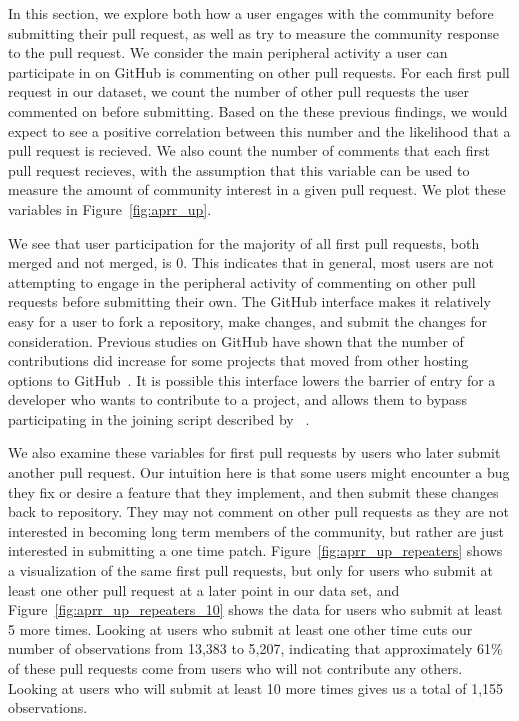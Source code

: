 \documentclass{iitthesis}
\begin{document}
 \label{chap:results}

 \label{sec:communities}

In this section, we explore both how a user engages with the community before
submitting their pull request, as well as try to measure the community response
to the pull request.  We consider the main peripheral activity a user can
participate in on GitHub is commenting on other pull requests. For each first
pull request in our dataset, we count the number of other pull requests the user
commented on before submitting. Based on the these previous findings, we would
expect to see a positive correlation between this number and the likelihood that
a pull request is recieved. We also count the number of comments that each first
pull request recieves, with the assumption that this variable can be used to
measure the amount of community interest in a given pull request. We plot these
variables in Figure~\ref{fig:aprr_up}.

We see that user participation for the majority of all first pull requests, both
merged and not merged, is 0. This indicates that in general, most users are not
attempting to engage in the peripheral activity of commenting on other pull
requests before submitting their own. The GitHub interface makes it relatively
easy for a user to fork a repository, make changes, and submit the changes for
consideration. Previous studies on GitHub have shown that the number of
contributions did increase for some projects that moved from other hosting
options to GitHub~\cite{mcdonald_performance_2013}. It is possible this
interface lowers the barrier of entry for a developer who wants to contribute to
a project, and allows them to bypass participating in the joining script
described by ~\cite{von_krogh_community_2003}.

We also examine these variables for first pull requests by users who later
submit another pull request. Our intuition here is that some users might
encounter a bug they fix or desire a feature that they implement, and then
submit these changes back to repository. They may not comment on other pull
requests as they are not interested in becoming long term members of the
community, but rather are just interested in submitting a one time patch.
Figure~\ref{fig:aprr_up_repeaters} shows a visualization of the same first pull
requests, but only for users who submit at least one other pull request at a
later point in our data set, and Figure~\ref{fig:aprr_up_repeaters_10} shows the
data for users who submit at least 5 more times. Looking at users who submit
at least one other time cuts our number of observations from 13,383 to 5,207,
indicating that approximately 61\% of these pull requests come from users who
will not contribute any others. Looking at users who will submit at least 10
more times gives us a total of 1,155 observations.
\end{document}
